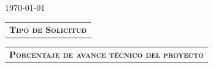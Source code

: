 \documentclass[12pt]{report}
\begin{document}
{\begin{minipage}{\textwidth}
{\begin{minipage}{0.70\textwidth}
\begin{center}
\begin{tabular}{c}
					\end{tabular}
				\end{center}
		\end{minipage}}\hspace{0.3cm}%
	\end{minipage}
}

\begin{center}
	\today
\end{center}

\vspace{0.1 cm}



\begin{minipage}{\textwidth}
	\begin{tabular}{l}
		\begin{minipage}[t]{0.55\textwidth}%
			\cellcolor{blue!10}\textsc{\textbf{Tipo de Solicitud}}
		\end{minipage}
	\end{tabular}	
	\begin{tabular}{l}
		\begin{minipage}[t]{0.43\textwidth}%
			\centering
			\cellcolor{blue!10}\textsc{\textbf{Porcentaje de avance técnico del proyecto}}
		\end{minipage}
	\end{tabular}	
\end{minipage}
\end{document}
